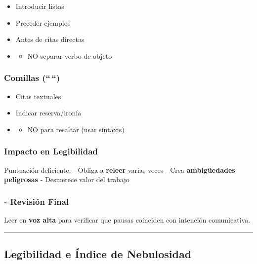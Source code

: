 \documentclass[
  11pt,
]{beaner}
\providecommand{\tightlist}{%
  \setlength{\itemsep}{0pt}\setlength{\parskip}{0pt}}
\begin{document}
\begin{itemize}
\tightlist
\item
  Introducir listas
\item
  Preceder ejemplos
\item
  Antes de citas directas
\item
  \begin{itemize}
  \tightlist
  \item
    NO separar verbo de objeto
  \end{itemize}
\end{itemize}

\subsubsection{Comillas (``\,``)}\label{comillas}

\begin{itemize}
\tightlist
\item
  Citas textuales
\item
  Indicar reserva/ironía
\item
  \begin{itemize}
  \tightlist
  \item
    NO para resaltar (usar sintaxis)
  \end{itemize}
\end{itemize}

\subsubsection{Impacto en Legibilidad}\label{impacto-en-legibilidad}

Puntuación deficiente: - Obliga a \textbf{releer} varias veces - Crea
\textbf{ambigüedades peligrosas} - Desmerece valor del trabajo

\subsubsection{- Revisión Final}\label{revisiuxf3n-final}

Leer en \textbf{voz alta} para verificar que pausas coinciden con
intención comunicativa.

\begin{center}\rule{0.5\linewidth}{0.5pt}\end{center}

\subsection{Legibilidad e Índice de
Nebulosidad}\label{legibilidad-e-uxedndice-de-nebulosidad}
\end{document}
